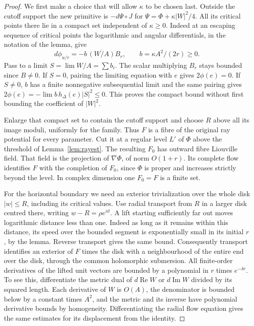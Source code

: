 \begin{proof}
We first make a choice that will allow $\kappa$ to be chosen last. Outside the cutoff support the new primitive is $-d\Psi\circ J$ for $\Psi=\Phi+\kappa|W|^2/4$. All its critical points there lie in a compact set independent of $\kappa\ge0$. Indeed at an escaping sequence of critical points the logarithmic and angular differentials, in the notation of the lemma, give
\[
         d\phi_{u/r}=-b\,\overline{(W/A)} B_r,
                    \qquad b=\kappa A^2/(2r)\ge0.
\]
Pass to a limit $S=\lim W/A=\sum b_i$. The scalar multiplying $B_r$ stays bounded since $B\ne0$. If $S=0$, pairing the limiting equation with $e$ gives $2\phi(e)=0$. If $S\ne0$, $b$ has a finite nonnegative subsequential limit and the same pairing gives $2\phi(e)=-\lim b\,h_\Delta(e)|S|^2\le0$. This proves the compact bound without first bounding the coefficient of $|W|^2$.

Enlarge that compact set to contain the cutoff support and choose $R$ above all its image moduli, uniformly for the family. Thus $F$ is a fibre of the original ray potential for every parameter. Cut it at a regular level $L'$ of $\Phi$ above the threshold of Lemma~\ref{lem:rayest}. The resulting $F_0$ has outward fibre Liouville field. That field is the projection of $\nabla\Phi$, of norm $O(1+r)$. Its complete flow identifies $F$ with the completion of $F_0$, since $\Phi$ is proper and increases strictly beyond the level. In complex dimension one $F_0=F$ is a finite set.

For the horizontal boundary we need an exterior trivialization over the whole disk $|w|\le R$, including its critical values. Use radial transport from $R$ in a larger disk centred there, writing $w-R=\rho e^{i\vartheta}$. A lift starting sufficiently far out moves logarithmic distance less than one. Indeed as long as it remains within this distance, its speed over the bounded segment is exponentially small in its initial $r$, by the lemma. Reverse transport gives the same bound. Consequently transport identifies an exterior of $F$ times the disk with a neighbourhood of the entire end over the disk, through the common holomorphic submersion. All finite-order derivatives of the lifted unit vectors are bounded by a polynomial in $r$ times $e^{-\delta r}$. To see this, differentiate the metric dual of $d\operatorname{Re}W$ or $d\operatorname{Im}W$ divided by its squared length. Each derivative of $W$ is $O(A)$, the denominator is bounded below by a constant times $A^2$, and the metric and its inverse have polynomial derivative bounds by homogeneity. Differentiating the radial flow equation gives the same estimates for its displacement from the identity.


\end{proof}
